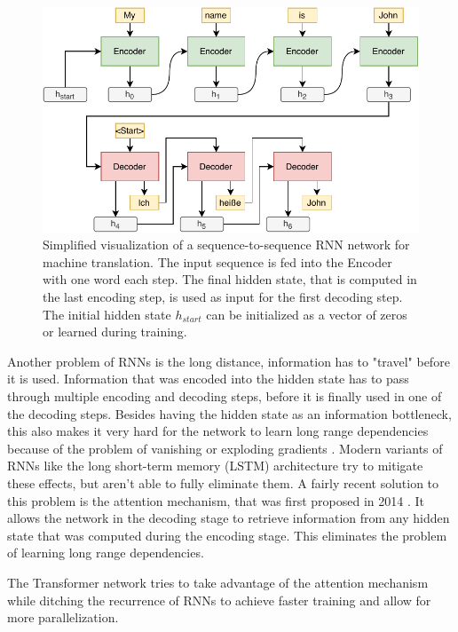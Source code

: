 \begin{figure}[h]
\centering
\includegraphics{figures/rnn-visualization}
\caption[Simplified visualization of a sequence-to-sequence RNN network for machine translation]{Simplified visualization of a sequence-to-sequence RNN network for machine translation. The input sequence is fed into the Encoder with one word each step. The final hidden state, that is computed in the last encoding step, is used as input for the first decoding step. The initial hidden state $h_{start}$ can be initialized as a vector of zeros or learned during training.}
\label{fig:rnn-visualization}
\end{figure}

Another problem of RNNs is the long distance, information has to "travel" before it is used.
Information that was encoded into the hidden state has to pass through multiple encoding and decoding steps, before it is finally used in one of the decoding steps.
Besides having the hidden state as an information bottleneck, this also makes it very hard for the network to learn long range dependencies because of the problem of vanishing or exploding gradients \cite{Hochreiter01gradientflow}.
Modern variants of RNNs like the long short-term memory (LSTM) architecture \cite{Hochreiter1997} try to mitigate these effects, but aren't able to fully eliminate them.
A fairly recent solution to this problem is the attention mechanism, that was first proposed in 2014 \cite{1409.0473}.
It allows the network in the decoding stage to retrieve information from any hidden state that was computed during the encoding stage.
This eliminates the problem of learning long range dependencies.

The Transformer network tries to take advantage of the attention mechanism while ditching the recurrence of RNNs to achieve faster training and allow for more parallelization.


